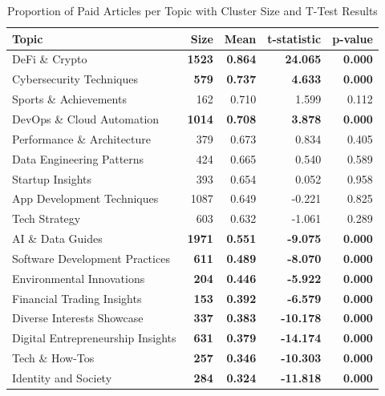 \documentclass[11pt,a4paper]{article}
\begin{document}
\begin{table}[H]
    \centering
    \caption{Proportion of Paid Articles per Topic with Cluster Size and T-Test Results}
    \label{tab:topic_proportions}
    \begin{tabular}{lrrrr}
        \toprule
        \textbf{Topic} & \textbf{Size} & \textbf{Mean} & \textbf{t-statistic} & \textbf{p-value} \\
        \midrule
        DeFi \& Crypto & \textbf{1523} & \textbf{0.864} & \textbf{24.065} & \textbf{0.000} \\
        Cybersecurity Techniques & \textbf{579} & \textbf{0.737} & \textbf{4.633} & \textbf{0.000} \\
        Sports \& Achievements & 162 & 0.710 & 1.599 & 0.112 \\
        DevOps \& Cloud Automation & \textbf{1014} & \textbf{0.708} & \textbf{3.878} & \textbf{0.000} \\
        Performance \& Architecture & 379 & 0.673 & 0.834 & 0.405 \\
        Data Engineering Patterns & 424 & 0.665 & 0.540 & 0.589 \\
        Startup Insights & 393 & 0.654 & 0.052 & 0.958 \\
        App Development Techniques & 1087 & 0.649 & -0.221 & 0.825 \\
        Tech Strategy & 603 & 0.632 & -1.061 & 0.289 \\
        AI \& Data Guides & \textbf{1971} & \textbf{0.551} & \textbf{-9.075} & \textbf{0.000} \\
        Software Development Practices & \textbf{611} & \textbf{0.489} & \textbf{-8.070} & \textbf{0.000} \\
        Environmental Innovations & \textbf{204} & \textbf{0.446} & \textbf{-5.922} & \textbf{0.000} \\
        Financial Trading Insights & \textbf{153} & \textbf{0.392} & \textbf{-6.579} & \textbf{0.000} \\
        Diverse Interests Showcase & \textbf{337} & \textbf{0.383} & \textbf{-10.178} & \textbf{0.000} \\
        Digital Entrepreneurship Insights & \textbf{631} & \textbf{0.379} & \textbf{-14.174} & \textbf{0.000} \\
        Tech \& How-Tos & \textbf{257} & \textbf{0.346} & \textbf{-10.303} & \textbf{0.000} \\
        Identity and Society & \textbf{284} & \textbf{0.324} & \textbf{-11.818} & \textbf{0.000} \\

\end{tabular}
\end{table}
\end{document}
